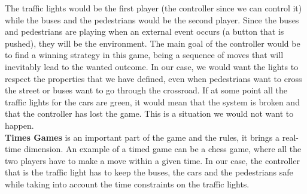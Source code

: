 The traffic lights would be the first player (the controller since we can control it) while the buses and the pedestrians would be the second player. Since the buses and pedestrians are playing when an external event occurs (a button that is pushed), they will be the environment. The main goal of the controller would be to find a winning strategy in this game, being a sequence of moves that will inevitably lead to the wanted outcome. In our case, we would want the lights to respect the properties that we have defined, even when pedestrians want to cross the street or buses want to go through the crossroad. If at some point all the traffic lights for the cars are green, it would mean that the system is broken and that the controller has lost the game. This is a situation we would not want to happen. \\

\textbf{Times Games} is an important part of the game and the rules, it brings a real-time dimension. An example of a timed game can be a chess game, where all the two players have to make a move within a given time. In our case, the controller that is the traffic light has to keep the buses, the cars and the pedestrians safe while taking into account the time constraints on the traffic lights.
